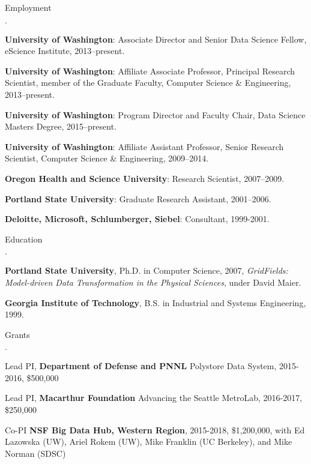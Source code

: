 \documentclass[10pt]{article}
\newcommand{\ptitle}{\em}
\newenvironment{bulletlist}
   {
      \begin{list}
         {$\cdot$}
         {
            \setlength{\itemsep}{.5ex}
            \setlength{\parsep}{0ex}
            \setlength{\leftmargin}{0.7em}
            \setlength{\parskip}{0ex}
            \setlength{\topsep}{0ex}
         }
   }
   {
      \end{list}
   }
\newcommand{\marginlabel}[1]{
\begin{minipage}[b]{0.8\labelwidth}{\large \textsf{\textbf{#1}}}\end{minipage}}
\newcommand{\entrylabel}[1]{\mbox{\marginlabel{#1}}\hfill}
\newcommand{\MainListlabel}[1]
   {
      \parbox[t]{\labelwidth}{\hspace{.8em}\marginlabel{#1}}
   }
\newenvironment{MainList}[1]
   {
      \renewcommand{\entrylabel}{\MainListlabel}
      \begin{list}{}
      {
         \renewcommand{\makelabel}{\entrylabel}
         \setlength   {\itemindent}{-.65em}
         \setlength   {\labelwidth}{#1}
         \setlength   {\leftmargin}{\labelwidth}
         \setlength   {\itemsep}{3ex}
      }
   }
   {
      \end{list}
   }
\begin{document}
\begin{MainList}{88pt}

\item [Employment]
\begin{bulletlist}
\item {\bf University of Washington}: Associate Director and Senior Data Science Fellow, eScience Institute, 2013--present.
\item {\bf University of Washington}: Affiliate Associate Professor, Principal Research Scientist, member of the Graduate Faculty, 
Computer Science \& Engineering, 2013--present.
\item {\bf University of Washington}: Program Director and Faculty Chair, Data Science Masters Degree, 2015--present.
\item {\bf University of Washington}: Affiliate Assistant Professor, Senior Research Scientist,
Computer Science \& Engineering, 2009--2014.
\item {\bf Oregon Health and Science University}: Research Scientist, 2007--2009.
\item {\bf Portland State University}: Graduate Research Assistant, 2001--2006.
\item {\bf Deloitte, Microsoft, Schlumberger, Siebel}: Consultant, 1999-2001.

\end{bulletlist}

\item [Education]
\begin{bulletlist}
\item {\bf Portland State University},
      Ph.D. in Computer Science, 2007,
{\ptitle GridFields: Model-driven Data Transformation in the Physical Sciences},
under David Maier.
\item {\bf Georgia Institute of Technology},
     B.S. in Industrial and Systems Engineering, 1999.
\end{bulletlist}

\item [Grants]
\begin{bulletlist}

\item Lead PI, {\bf Department of Defense and PNNL} Polystore Data System, 2015-2016, \$500,000

\item Lead PI, {\bf Macarthur Foundation} Advancing  the Seattle MetroLab, 2016-2017, \$250,000

\item Co-PI {\bf NSF Big Data Hub, Western Region}, 2015-2018, \$1,200,000, with Ed Lazowska (UW), Ariel Rokem (UW), Mike Franklin (UC Berkeley), and Mike Norman (SDSC)


\end{bulletlist}
\end{MainList}
\end{document}

